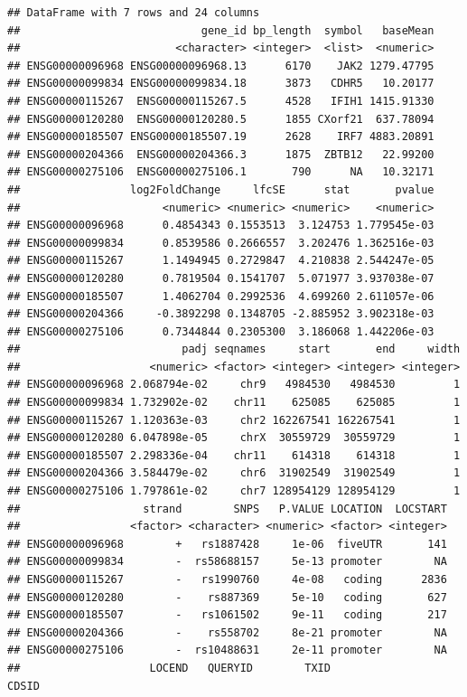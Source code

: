 \documentclass[9pt,a4paper,]{extarticle}
\begin{document}
\begin{verbatim}
## DataFrame with 7 rows and 24 columns
##                            gene_id bp_length  symbol   baseMean
##                        <character> <integer>  <list>  <numeric>
## ENSG00000096968 ENSG00000096968.13      6170    JAK2 1279.47795
## ENSG00000099834 ENSG00000099834.18      3873   CDHR5   10.20177
## ENSG00000115267  ENSG00000115267.5      4528   IFIH1 1415.91330
## ENSG00000120280  ENSG00000120280.5      1855 CXorf21  637.78094
## ENSG00000185507 ENSG00000185507.19      2628    IRF7 4883.20891
## ENSG00000204366  ENSG00000204366.3      1875  ZBTB12   22.99200
## ENSG00000275106  ENSG00000275106.1       790      NA   10.32171
##                 log2FoldChange     lfcSE      stat       pvalue
##                      <numeric> <numeric> <numeric>    <numeric>
## ENSG00000096968      0.4854343 0.1553513  3.124753 1.779545e-03
## ENSG00000099834      0.8539586 0.2666557  3.202476 1.362516e-03
## ENSG00000115267      1.1494945 0.2729847  4.210838 2.544247e-05
## ENSG00000120280      0.7819504 0.1541707  5.071977 3.937038e-07
## ENSG00000185507      1.4062704 0.2992536  4.699260 2.611057e-06
## ENSG00000204366     -0.3892298 0.1348705 -2.885952 3.902318e-03
## ENSG00000275106      0.7344844 0.2305300  3.186068 1.442206e-03
##                         padj seqnames     start       end     width
##                    <numeric> <factor> <integer> <integer> <integer>
## ENSG00000096968 2.068794e-02     chr9   4984530   4984530         1
## ENSG00000099834 1.732902e-02    chr11    625085    625085         1
## ENSG00000115267 1.120363e-03     chr2 162267541 162267541         1
## ENSG00000120280 6.047898e-05     chrX  30559729  30559729         1
## ENSG00000185507 2.298336e-04    chr11    614318    614318         1
## ENSG00000204366 3.584479e-02     chr6  31902549  31902549         1
## ENSG00000275106 1.797861e-02     chr7 128954129 128954129         1
##                   strand        SNPS   P.VALUE LOCATION  LOCSTART
##                 <factor> <character> <numeric> <factor> <integer>
## ENSG00000096968        +   rs1887428     1e-06  fiveUTR       141
## ENSG00000099834        -  rs58688157     5e-13 promoter        NA
## ENSG00000115267        -   rs1990760     4e-08   coding      2836
## ENSG00000120280        -    rs887369     5e-10   coding       627
## ENSG00000185507        -   rs1061502     9e-11   coding       217
## ENSG00000204366        -    rs558702     8e-21 promoter        NA
## ENSG00000275106        -  rs10488631     2e-11 promoter        NA
##                    LOCEND   QUERYID        TXID                    CDSID

\end{verbatim}
\end{document}
